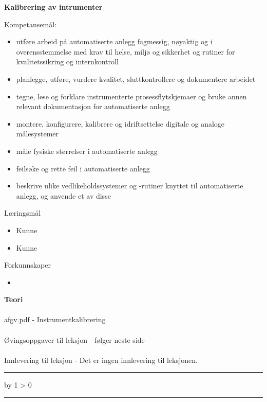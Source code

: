\documentclass[12pt,a4paper]{article}
\def\oppgave{
            \advance\questnum by 1
            \ifnum \questnum > 0
                 \hrule
                 \vskip 3pt
                 \leftline{Oppgave \the\questnum}
                 \vskip 3pt \fi}
\begin{document}
\centerline{\bf Kalibrering av intrumenter}  \bigskip

Kompetansemål:
\begin{itemize}[noitemsep]

	\item utføre arbeid på automatiserte anlegg fagmessig, nøyaktig og i overensstemmelse med krav til helse, miljø og sikkerhet og rutiner for kvalitetssikring og internkontroll
	\item planlegge, utføre, vurdere kvalitet, sluttkontrollere og dokumentere arbeidet
	\item tegne, lese og forklare instrumenterte prosessflytskjemaer og bruke annen relevant dokumentasjon for automatiserte anlegg
	\item montere, konfigurere, kalibrere og idriftsettelse digitale og analoge målesystemer
	\item måle fysiske størrelser i automatiserte anlegg
	\item feilsøke og rette feil i automatiserte anlegg
	\item beskrive ulike vedlikeholdssystemer og -rutiner knyttet til automatiserte anlegg, og anvende et av disse
\end{itemize}
	Læringsmål
	\begin{itemize}[noitemsep]
		\item Kunne 
		\item Kunne 
	\end{itemize}

	Forkunnskaper

	\begin{itemize}[noitemsep]
		\item 

	\end{itemize}
\textbf{Teori}\\\\
afgv.pdf - Instrumentkalibrering\\\\
Øvingsoppgaver til leksjon - følger neste side\\\\
Innlevering til leksjon - Det er ingen innlevering til leksjonen. 
\bigskip 
\hrule
\vfil \eject
\vfil \eject

\oppgave{} 
\end{document}
